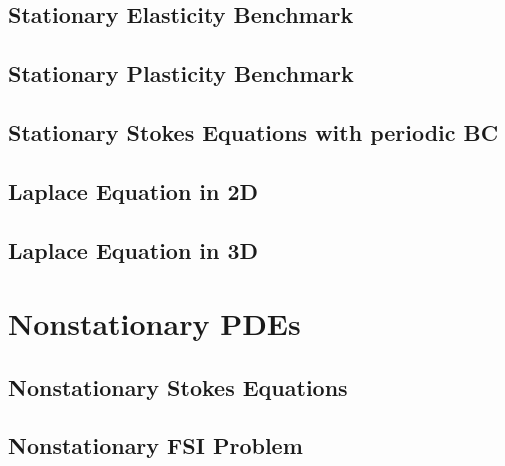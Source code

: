 \documentclass[a4paper,cleardoubleempty]{scrreprt}
\begin{document}
\subsection{Stationary Elasticity Benchmark} 
\label{PDE_Stat_Elasticity}

\clearpage
\subsection{Stationary Plasticity Benchmark} 
\label{PDE_Stat_Plasticity}

\clearpage
\subsection{Stationary Stokes Equations with periodic BC} 
\label{PDE_Stat_Periodic_Stokes}

\clearpage
\subsection{Laplace Equation in 2D} 
\label{PDE_Stat_Laplace_2D}

\clearpage
\subsection{Laplace Equation in 3D}
\label{PDE_Stat_Laplace_3D}

\clearpage
\section{Nonstationary PDEs}
\label{PDE_Instat}

\subsection{Nonstationary Stokes Equations}
\label{PDE_Instat_Stokes}

\clearpage
\subsection{Nonstationary FSI Problem}
\label{PDE_Instat_FSI}

\clearpage
\end{document}
